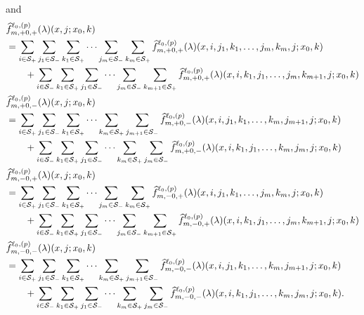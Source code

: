 and
\begin{align}
	\nonumber&\widehat f_{m,+0,+}^{\ell_0,(p)}(\lambda)( x,j;x_0,k) 
	\\&= \sum_{i\in\mathcal{S}_+}\sum_{j_1\in\mathcal S_-} \sum_{k_1\in\mathcal S_+}\dots \sum_{j_m\in\mathcal S_-}\sum_{k_m\in\mathcal S_+}\widehat  f_{m,+0,+}^{\ell_0,(p)}(\lambda)( x,i,j_1,k_1,\dots,j_m,k_m, j; x_0,k)  \nonumber 
	\\&\qquad {} + \sum_{i\in\mathcal{S}_-}\sum_{k_1\in\mathcal S_+}\sum_{j_1\in\mathcal S_-} \dots \sum_{j_m\in\mathcal S_-}\sum_{k_{m+1}\in\mathcal S_+}\widehat  f_{m,+0,+}^{\ell_0,(p)}(\lambda)( x,i,k_1,j_1,\dots,j_m,k_{m+1}, j; x_0,k)  \label{eqn: f advh2}
	\\\nonumber&\widehat f_{m,+0,-}^{\ell_0,(p)}(\lambda)( x,j;x_0,k) 
	\\&= \sum_{i\in\mathcal{S}_+}\sum_{j_1\in\mathcal S_-} \sum_{k_1\in\mathcal S_+}\dots \sum_{k_m\in\mathcal S_+}\sum_{j_{m+1}\in\mathcal S_-}\widehat  f_{m,+0,-}^{\ell_0,(p)}(\lambda)( x,i,j_1,k_1,\dots,k_m,j_{m+1}, j; x_0,k)  \nonumber 
	\\&\qquad {} + \sum_{i\in\mathcal{S}_-}\sum_{k_1\in\mathcal S_+}\sum_{j_1\in\mathcal S_-} \dots\sum_{k_{m}\in\mathcal S_+} \sum_{j_m\in\mathcal S_-}\widehat  f_{m,+0,-}^{\ell_0,(p)}(\lambda)( x,i,k_1,j_1,\dots,k_{m},j_m, j; x_0,k)
	\\\nonumber&\widehat f_{m,-0,+}^{\ell_0,(p)}(\lambda)( x,j;x_0,k) 
	\\&= \sum_{i\in\mathcal{S}_+}\sum_{j_1\in\mathcal S_-} \sum_{k_1\in\mathcal S_+}\dots\sum_{j_{m}\in\mathcal S_-} \sum_{k_m\in\mathcal S_+}\widehat  f_{m,-0,+}^{\ell_0,(p)}(\lambda)( x,i,j_1,k_1,\dots,j_{m},k_m, j; x_0,k)  \nonumber 
	\\&\qquad {} + \sum_{i\in\mathcal{S}_-}\sum_{k_1\in\mathcal S_+}\sum_{j_1\in\mathcal S_-} \dots \sum_{j_m\in\mathcal S_-}\sum_{k_{m+1}\in\mathcal S_+}\widehat  f_{m,-0,+}^{\ell_0,(p)}(\lambda)( x,i,k_1,j_1,\dots,j_{m},k_{m+1}, j; x_0,k)
	\\\nonumber&\widehat f_{m,-0,-}^{\ell_0,(p)}(\lambda)( x,j;x_0,k) 
	\\&= \sum_{i\in\mathcal{S}_+}\sum_{j_1\in\mathcal S_-} \sum_{k_1\in\mathcal S_+}\dots \sum_{k_m\in\mathcal S_+}\sum_{j_{m+1}\in\mathcal S_-}\widehat  f_{m,-0,-}^{\ell_0,(p)}(\lambda)( x,i,j_1,k_1,\dots,k_m,j_{m+1}, j; x_0,k)  \nonumber 
	\\&\qquad {} + \sum_{i\in\mathcal{S}_-}\sum_{k_1\in\mathcal S_+}\sum_{j_1\in\mathcal S_-} \dots \sum_{k_{m}\in\mathcal S_+}\sum_{j_m\in\mathcal S_-}\widehat  f_{m,-0,-}^{\ell_0,(p)}(\lambda)( x,i,k_1,j_1,\dots,k_{m},j_m, j; x_0,k) .
\end{align}


